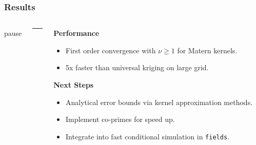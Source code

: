 \documentclass[serif,10pt, aspectratio=169]{beamer}
\begin{document}
\begin{frame}
	\frametitle{Results}
	\begin{columns}[T]
    pause
    
    \begin{column}{.01\textwidth} 
        \rule{.1mm}{0.7\textheight}
    \end{column}

    \begin{column}{0.47\textwidth}
    \textbf{Performance}
    \begin{itemize}
	\item First order convergence with $\nu \geq 1$ for Matern kernels.
	\item 5x faster than universal kriging on large grid. 
    \end{itemize} \pause
    \textbf{Next Steps}
    \begin{itemize}
    	\item Analytical error bounds via kernel approximation methods.
	\item Implement co-primes for speed up. 
	\item Integrate into fast conditional simulation in \texttt{fields}.
    \end{itemize} 
    \end{column}
\end{columns}

\end{frame}







\end{document}
